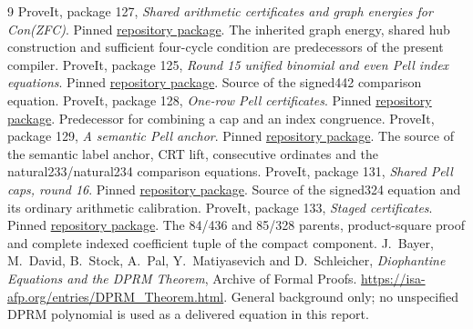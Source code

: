 \documentclass[11pt,letterpaper]{article}
\theoremstyle{definition}\newtheorem{definition}[theorem]{Definition}
\theoremstyle{remark}\newtheorem{remark}[theorem]{Remark}
\begin{document}
\begin{thebibliography}{9}
 ProveIt, package 127, \emph{Shared arithmetic certificates
and graph energies for Con(ZFC)}. Pinned
\href{https://github.com/VladimirReshetnikov/ProveIt/tree/1c5367452a0bd4dd7e9e4bceb1508b62dbd2ff61/Computability/DiophantineConsistency/con-zfc-diophantine-forms/127-graph-certificates}{repository package}.
The inherited graph energy, shared hub construction and sufficient
four-cycle condition are predecessors of the present compiler.
 ProveIt, package 125, \emph{Round 15 unified binomial and
even Pell index equations}. Pinned
\href{https://github.com/VladimirReshetnikov/ProveIt/tree/1c5367452a0bd4dd7e9e4bceb1508b62dbd2ff61/Computability/DiophantineConsistency/con-zfc-diophantine-forms/125-unified-binomial-round15}{repository package}.
Source of the signed442 comparison equation.
 ProveIt, package 128, \emph{One-row Pell certificates}.
Pinned \href{https://github.com/VladimirReshetnikov/ProveIt/tree/1c5367452a0bd4dd7e9e4bceb1508b62dbd2ff61/Computability/DiophantineConsistency/con-zfc-diophantine-forms/128-one-row-pell}{repository package}.
Predecessor for combining a cap and an index congruence.
 ProveIt, package 129, \emph{A semantic Pell anchor}.
Pinned \href{https://github.com/VladimirReshetnikov/ProveIt/tree/1c5367452a0bd4dd7e9e4bceb1508b62dbd2ff61/Computability/DiophantineConsistency/con-zfc-diophantine-forms/129-semantic-pell-anchor}{repository package}.
The source of the semantic label anchor, CRT lift, consecutive ordinates
and the natural233/natural234 comparison equations.
 ProveIt, package 131, \emph{Shared Pell caps, round 16}.
Pinned \href{https://github.com/VladimirReshetnikov/ProveIt/tree/1c5367452a0bd4dd7e9e4bceb1508b62dbd2ff61/Computability/DiophantineConsistency/con-zfc-diophantine-forms/131-shared-pell-caps-round16}{repository package}.
Source of the signed324 equation and its ordinary arithmetic calibration.
 ProveIt, package 133, \emph{Staged certificates}.
Pinned \href{https://github.com/VladimirReshetnikov/ProveIt/tree/1c5367452a0bd4dd7e9e4bceb1508b62dbd2ff61/Computability/DiophantineConsistency/con-zfc-diophantine-forms/133-staged-certificates}{repository package}.
The 84/436 and 85/328 parents, product-square proof and complete indexed
coefficient tuple of the compact component.
 J.~Bayer, M.~David, B.~Stock, A.~Pal, Y.~Matiyasevich and
D.~Schleicher, \emph{Diophantine Equations and the DPRM Theorem}, Archive
of Formal Proofs. \url{https://isa-afp.org/entries/DPRM_Theorem.html}.
General background only; no unspecified DPRM polynomial is used as a
delivered equation in this report.
\end{thebibliography}
\end{document}
